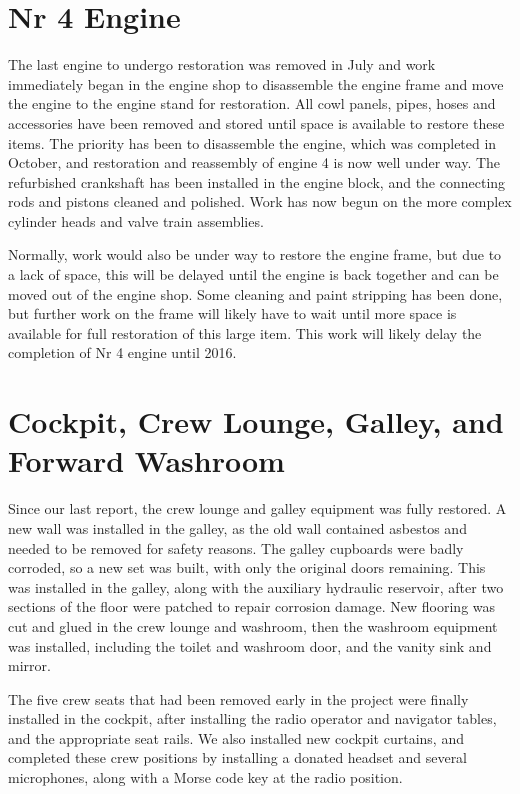 \section{Nr 4 Engine}
\label{sec:engine_4}

The last engine to undergo restoration was removed in July and work
immediately began in the engine shop to disassemble the engine frame
and move the engine to the engine stand for restoration.  All cowl
panels, pipes, hoses and accessories have been removed and stored
until space is available to restore these items.  The priority has
been to disassemble the engine, which was completed in October, and
restoration and reassembly of engine 4 is now well under way.  The
refurbished crankshaft has been installed in the engine block, and the
connecting rods and pistons cleaned and polished.  Work has now begun
on the more complex cylinder heads and valve train assemblies.

Normally, work would also be under way to restore the engine frame, but
due to a lack of space, this will be delayed until the engine is back
together and can be moved out of the engine shop.  Some cleaning and
paint stripping has been done, but further work on the frame will
likely have to wait until more space is available for full restoration
of this large item.  This work will likely delay the completion of Nr
4 engine until 2016.

\section{Cockpit, Crew Lounge, Galley,  and Forward Washroom}
\label{crewlounge}

Since our last report, the crew lounge and galley equipment was fully
restored.  A new wall was installed in the galley, as the old wall
contained asbestos and needed to be removed for safety reasons.  The
galley cupboards were badly corroded, so a new set was built, with
only the original doors remaining.  This was installed in the galley,
along with the auxiliary hydraulic reservoir, after two sections of
the floor were patched to repair corrosion damage.  New flooring was
cut and glued in the crew lounge and washroom, then the washroom
equipment was installed, including the toilet and washroom door, and
the vanity sink and mirror.

The five crew seats that had been removed early in the project were
finally installed in the cockpit, after installing the radio operator
and navigator tables, and the appropriate seat rails.  We also
installed new cockpit curtains, and completed these crew positions by
installing a donated headset and several microphones, along with a
Morse code key at the radio position.

